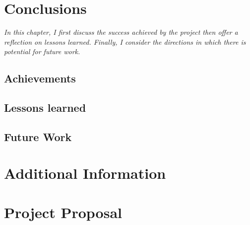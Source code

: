 \documentclass[12pt,a4paper,twoside,openright]{report}
\theoremstyle{definition}
\begin{document}
\chapter{Conclusions}
\textit{In this chapter, I first discuss the success achieved by the project then offer a reflection on lessons learned. Finally, I consider the directions in which there is potential for future work.}
\section{Achievements}

\section{Lessons learned}

\section{Future Work}




\nocite{*}
% 




\appendix

\chapter{Additional Information}

%
%
%
%
%


\chapter{Project Proposal}
\label{chap:proposal}

\end{document}
